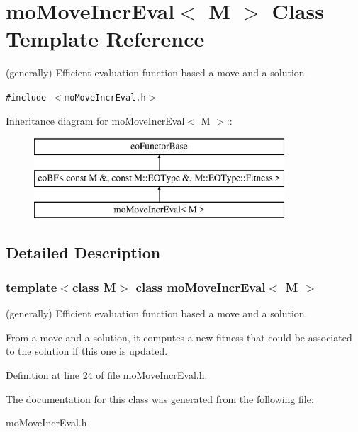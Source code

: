 \section{moMoveIncrEval$<$ M $>$ Class Template Reference}
\label{classmo_move_incr_eval}
(generally) Efficient evaluation function based a move and a solution.  


{\tt \#include $<$moMoveIncrEval.h$>$}

Inheritance diagram for moMoveIncrEval$<$ M $>$::\begin{figure}[H]
\begin{center}
\leavevmode
\includegraphics[height=3cm]{classmo_move_incr_eval}
\end{center}
\end{figure}


\subsection{Detailed Description}
\subsubsection*{template$<$class M$>$ class moMoveIncrEval$<$ M $>$}

(generally) Efficient evaluation function based a move and a solution. 

From a move and a solution, it computes a new fitness that could be associated to the solution if this one is updated. 



Definition at line 24 of file moMoveIncrEval.h.

The documentation for this class was generated from the following file:\begin{CompactItemize}
\item 
moMoveIncrEval.h\end{CompactItemize}

